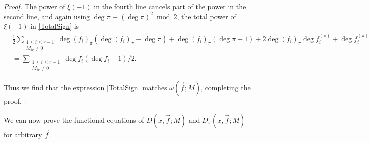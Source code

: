\documentclass[11pt,letterpaper]{article}
\theoremstyle{definition}
\theoremstyle{remark}
\numberwithin{equation}{section}
\theoremstyle{dotless}
\begin{document}
\begin{proof}
The power of $\xi(-1)$ in the fourth line cancels part of the power in the second line, and again using $\deg \pi \equiv (\deg \pi)^2 \bmod 2$, the total power of $\xi(-1)$ in \eqref{TotalSign} is 
\begin{equation*}
\begin{split}
& \frac12 \sum_{\substack{1 \leq i \leq r-1 \\ M_{ir} \neq 0}} \deg (f_i)_\pi (\deg (f_i)_\pi-\deg \pi)+\deg (f_i)_\pi(\deg \pi -1) + 2 \deg (f_i)_\pi \deg f_i^{(\pi)}+\deg f_i^{(\pi)}(\deg f_i^{(\pi)}-1) \\
& =\sum_{\substack{1 \leq i \leq r-1 \\ M_{ir} \neq 0}} \deg f_i(\deg f_i-1)/2.
\end{split}
\end{equation*}

Thus we find that the expression \eqref{TotalSign} matches $\omega(\vec{f}; M)$, completing the proof.
\end{proof}

We can now prove the functional equations of $D(x, \vec{f}; M)$  and $D_\pi(x, \vec{f}; M)$ for arbitrary $\vec{f}$.
\end{document}

